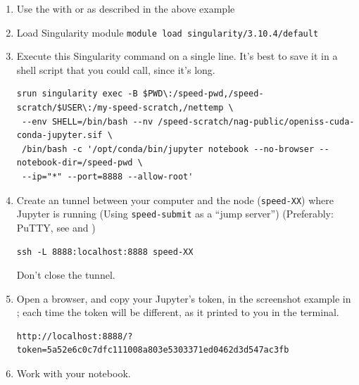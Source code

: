 \begin{enumerate}
\item
Use the  with  or  as described in the above example

\item
Load Singularity module
\verb+module load singularity/3.10.4/default+

\item
Execute this Singularity command on a single line. It's best to save it in a shell script
that you could call, since it's long.
\scriptsize
\begin{verbatim}
srun singularity exec -B $PWD\:/speed-pwd,/speed-scratch/$USER\:/my-speed-scratch,/nettemp \
 --env SHELL=/bin/bash --nv /speed-scratch/nag-public/openiss-cuda-conda-jupyter.sif \
 /bin/bash -c '/opt/conda/bin/jupyter notebook --no-browser --notebook-dir=/speed-pwd \
 --ip="*" --port=8888 --allow-root'
\end{verbatim}
\normalsize

\item
Create an  tunnel between your computer and the node (\texttt{speed-XX}) where Jupyter is
running (Using \texttt{speed-submit} as a ``jump server'') (Preferably: PuTTY, see  and )
\begin{verbatim}
ssh -L 8888:localhost:8888 speed-XX
\end{verbatim}
Don't close the tunnel.

\item
Open a browser, and copy your Jupyter's token, in the screenshot
example in ; each time the token will be different,
as it printed to you in the terminal.

\small
\begin{verbatim}
http://localhost:8888/?token=5a52e6c0c7dfc111008a803e5303371ed0462d3d547ac3fb
\end{verbatim}
\normalsize

\item
Work with your notebook.

\end{enumerate}

